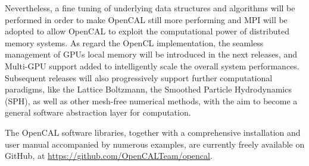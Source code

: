 Nevertheless, a fine tuning of underlying data structures and
algorithms will be performed in order to make OpenCAL still more
performing and MPI will be adopted to allow OpenCAL to exploit the
computational power of distributed memory systems. As regard the
OpenCL implementation, the seamless management of GPUs local memory
will be introduced in the next releases, and Multi-GPU support added
to intelligently scale the overall system performances. Subsequent
releases will also progressively support further computational
paradigms, like the Lattice Boltzmann, the Smoothed Particle
Hydrodynamics (SPH), as well as other mesh-free numerical methods,
with the aim to become a general software abstraction layer for
computation.

The OpenCAL software libraries, together with a comprehensive
installation and user manual accompanied by numerous examples, are
currently freely available on GitHub, at \url{https://github.com/OpenCALTeam/opencal}.



